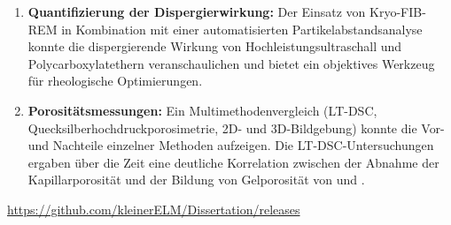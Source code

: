 \documentclass[11pt, a4paper]{article}
\begin{document}
\begin{enumerate}[label=\textbf{\arabic*.}, leftmargin=1.5cm, labelsep=0.5cm, itemsep=0.5em, resume]
    \item \textbf{Quantifizierung der Dispergierwirkung:} Der Einsatz von Kryo-FIB-REM in Kombination mit einer automatisierten Partikelabstandsanalyse konnte die dispergierende Wirkung von Hochleistungsultraschall und Polycarboxylatethern veranschaulichen und bietet ein objektives Werkzeug für rheologische Optimierungen.
    \item \textbf{Porositätsmessungen:} Ein Multimethodenvergleich (LT-DSC, Quecksilberhochdruckporosimetrie, 2D- und 3D-Bildgebung) konnte die Vor- und Nachteile einzelner Methoden aufzeigen. Die LT-DSC-Untersuchungen ergaben über die Zeit eine deutliche Korrelation zwischen der Abnahme der Kapillarporosität und der Bildung von Gelporosität von  und .
\end{enumerate}

\vfill
\begin{center}
    \hspace*{.5cm}\url{https://github.com/kleinerELM/Dissertation/releases}
\end{center}
\end{document}
